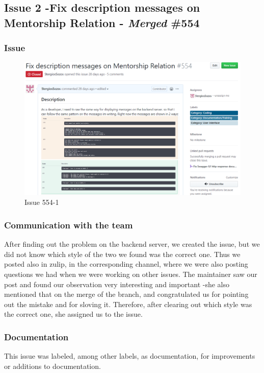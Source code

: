 \documentclass{article}
\begin{document}
\subsection{Issue 2 -Fix description messages on Mentorship Relation - \emph{Merged} \#554}
\subsubsection{Issue}
\begin{figure}[tph!]
\centerline{\includegraphics[totalheight=13cm, width=16cm]{issue554part1.png}}
    \caption{Issue 554-1}
    \label{fig:verticalcell}
\end{figure}

\vfill
\clearpage

\subsubsection{Communication with the team}
After finding out the problem on the backend server, we created the issue, but we did not know which style of the two we found was the correct one. Thus we posted also in zulip, in the corresponding channel, where we were also posting questions we had when we were working on other issues. The maintainer saw our post and found our observation very interesting and important -she also mentioned that on the merge of the branch, and congratulated us for pointing out the mistake and for sloving it. Therefore, after clearing out which style was the correct one, she assigned us to the issue.
\subsubsection{Documentation}
This issue was labeled, among other labels, as documentation, for improvements or additions to documentation.
\end{document}
